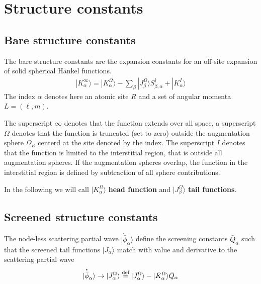 \documentclass[11pt,a4paper]{report}
\begin{document}
\section{Structure constants}
\subsection{Bare structure constants}
The bare structure constants are the expansion constants for an
off-site expansion of solid spherical Hankel functions.
\begin{eqnarray}
|K_{\alpha}^\infty\rangle=|K^\Omega_{\alpha}\rangle
-\sum_{\beta}|J^\Omega_{\beta}\rangle S^\dagger_{\beta,\alpha}
+|K^I_{\alpha}\rangle
\end{eqnarray}
The index $\alpha$ denotes here an atomic site $R$ and a set of
angular momenta $L=(\ell,m)$.

The superscript $\infty$ denotes that the function extends over all
space, a superscript $\Omega$ denotes that the function is truncated
(set to zero) outside the augmentation sphere $\Omega_{R}$ centerd at
the site denoted by the index. The superscript $I$ denotes that the
function is limited to the interstitial region, that is outside all
augmentation spheres. If the augmentation spheres overlap, the
function in the interstitial region is defined by subtraction of all
sphere contributions.

In the following we will call $|K^\Omega_{\alpha}\rangle$ \textbf{head
  function} and $|J^\Omega_{\beta}\rangle$
\textbf{tail functions}.


\subsection{Screened structure constants}
The node-less scattering partial wave
$|\dot{\bar{\phi}}_\alpha\rangle$ define the screening constants
$\bar{Q}_{\alpha}$ such that the screened tail functions
$|\bar{J}_\alpha\rangle$ match with value and derivative to the
scattering partial wave
\begin{eqnarray}
|\overset{\mbox{\large\bfseries .}}{\bar{\phi}}_\alpha\rangle \rightarrow 
|\bar{J}^{\Omega}_{\alpha}\rangle
\stackrel{\text{def}}{=}
|\bar{J}^{\Omega}_{\alpha}\rangle
-|\bar{K}^{\Omega}_{\alpha}\rangle \bar{Q}_{\alpha}
\end{eqnarray}
\end{document}
